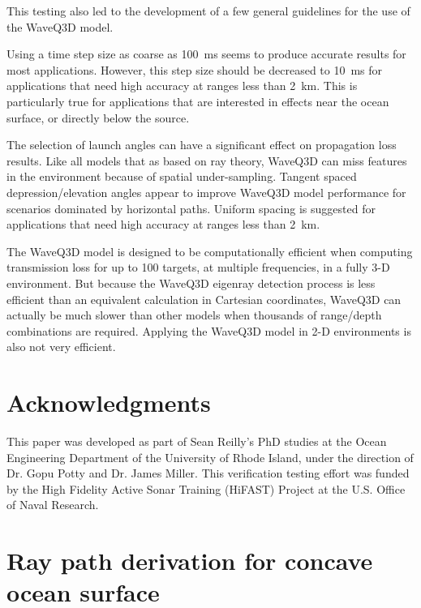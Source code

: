 \documentclass{ws-jca}
\begin{document}
This testing also led to the development of a few general guidelines for the
use of the WaveQ3D model.
\begin{itemlist}
\item Using a time step size as coarse as 100~ms seems to produce accurate
results for most applications. However, this step size should be decreased
to 10~ms for applications that need high accuracy at ranges less than 2~km.
This is particularly true for applications that are interested in effects
near the ocean surface, or directly below the source.
\item The selection of launch angles can have a significant effect on
propagation loss results. Like all models that as based on ray theory, WaveQ3D
can miss features in the environment because of spatial under-sampling.
Tangent spaced depression/elevation angles appear to improve WaveQ3D model
performance for scenarios dominated by horizontal paths. Uniform spacing is
suggested for applications that need high accuracy at ranges less than
2~km.
\item The WaveQ3D model is designed to be computationally efficient when
computing transmission loss for up to 100 targets, at multiple frequencies,
in a fully 3-D environment. But because the WaveQ3D eigenray detection
process is less efficient than an equivalent calculation in Cartesian
coordinates, WaveQ3D can actually be much slower than other models when
thousands of range/depth combinations are required. Applying the WaveQ3D
model in 2-D environments is also not very efficient.
\end{itemlist}

\section*{Acknowledgments}

This paper was developed as part of Sean Reilly's PhD studies at the Ocean
Engineering Department of the University of Rhode Island, under the
direction of Dr. Gopu Potty and Dr. James Miller. This verification testing
effort was funded by the High Fidelity Active Sonar Training (HiFAST)
Project at the U.S. Office of Naval Research.

\appendix

\section{Ray path derivation for concave ocean surface}
\end{document}

